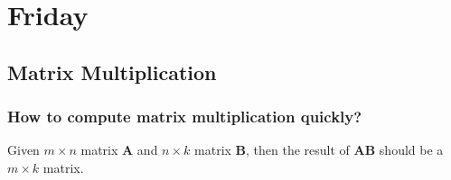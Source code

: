 
\section{Friday}

\subsection{Matrix Multiplication}
\subsubsection{How to compute matrix multiplication quickly?}
Given $m\times n$ matrix $\bm A$ and $n\times k$ matrix $\bm B$, then the result of $\bm{AB}$ should be a $m\times k$ matrix.

